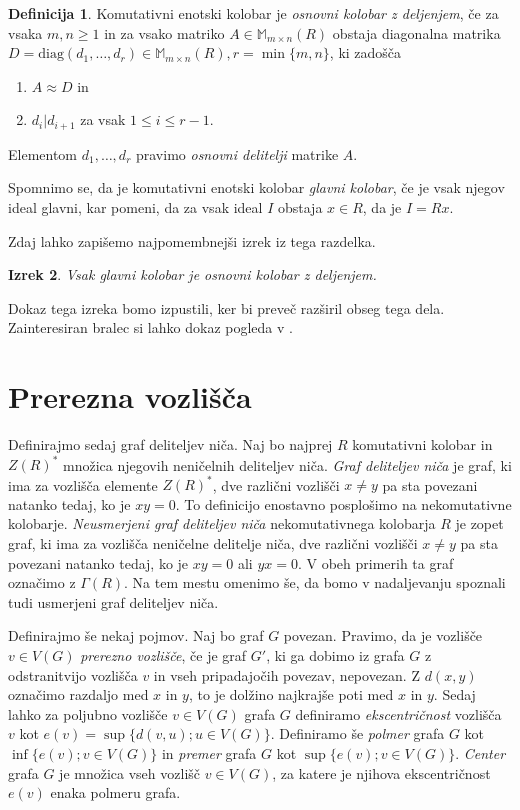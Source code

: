 \documentclass[a4paper, 12pt]{amsart}
\theoremstyle{definition} %
\newtheorem{definicija}{Definicija}[section]
\theoremstyle{plain} %
\newtheorem{izrek}[definicija]{Izrek}
\newcommand{\M}{\mathbb M}
\begin{document}
\begin{definicija}
Komutativni enotski kolobar je \emph{osnovni kolobar z deljenjem}, če za vsaka $m,n\ge 1$ in za vsako matriko $A\in \M_{m\times n}(R)$ obstaja diagonalna matrika $D= \textrm{diag}(d_1,\dots,d_r) \in \M_{m\times n} (R), r = \min\{m,n\}$, ki zadošča
\begin{enumerate}
\item $A\approx D$ in
\item $d_i | d_{i+1}$ za vsak $1 \le i \le r-1$.
\end{enumerate} 
Elementom $d_1, \dots, d_r$ pravimo \emph{osnovni delitelji} matrike $A$.
\end{definicija}
Spomnimo se, da je komutativni enotski kolobar \emph{glavni kolobar}, če je vsak njegov ideal glavni, kar pomeni, da za vsak ideal $I$ obstaja $x\in R$, da je $I=Rx$. 

Zdaj lahko zapišemo najpomembnejši izrek iz tega razdelka.
\begin{izrek}
\label{PIR-elementaryDivisionRing}
Vsak glavni kolobar je osnovni kolobar z deljenjem.
\end{izrek}
Dokaz tega izreka bomo izpustili, ker bi preveč razširil obseg tega dela. Zainteresiran bralec si lahko dokaz pogleda v \cite[ Izrek 15.9]{Brown}.

\section{Prerezna vozlišča}
Definirajmo sedaj graf deliteljev niča. Naj bo najprej $R$ komutativni kolobar in $Z(R)^*$ množica njegovih neničelnih deliteljev niča. \emph{Graf deliteljev niča} je graf, ki ima za vozlišča elemente $Z(R)^*$, dve različni vozlišči $x\neq y$ pa sta povezani natanko tedaj, ko je $xy=0$. To definicijo enostavno posplošimo na nekomutativne kolobarje. \emph{Neusmerjeni graf deliteljev niča} nekomutativnega kolobarja $R$ je zopet graf, ki ima za vozlišča neničelne delitelje niča, dve različni vozlišči $x\neq y$ pa sta povezani natanko tedaj, ko je $xy=0$ ali $yx=0$. V obeh primerih ta graf označimo z $\Gamma(R)$. Na tem mestu omenimo še, da bomo v nadaljevanju spoznali tudi usmerjeni graf deliteljev niča.

Definirajmo še nekaj pojmov. Naj bo graf $G$ povezan. Pravimo, da je vozlišče $v\in V(G)$ \emph{prerezno vozlišče}, če je graf $G'$, ki ga dobimo iz grafa $G$ z odstranitvijo vozlišča $v$ in vseh pripadajočih povezav, nepovezan. Z $d(x,y)$ označimo razdaljo med $x$ in $y$, to je dolžino najkrajše poti med $x$ in $y$. Sedaj lahko za poljubno vozlišče $v \in V(G)$ grafa $G$ definiramo \emph{ekscentričnost} vozlišča $v$ kot $e(v) = \sup\{d(v,u);u\in V(G)\}$. Definiramo še \emph{polmer} grafa $G$ kot $\inf\{e(v); v\in V(G)\}$ in \emph{premer} grafa $G$ kot $\sup\{ e(v); v\in V(G)\}$.  \emph{Center} grafa $G$  je množica vseh vozlišč $v\in V(G)$, za katere je njihova ekscentričnost $e(v)$ enaka polmeru grafa.
\end{document}

